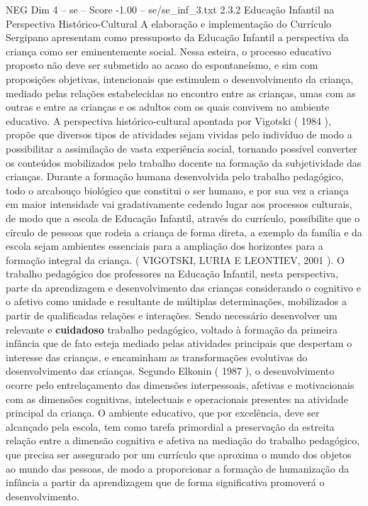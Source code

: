 \begin{textsample}{NEG Dim 4 – se – Score -1.00 – se/se\_inf\_3.txt}  \label{ex:f4_neg_145}
2.3.2 Educação Infantil na Perspectiva Histórico-Cultural A elaboração e implementação do Currículo Sergipano apresentam como pressuposto da Educação Infantil a perspectiva da criança como ser eminentemente social.
Nessa esteira, o processo educativo proposto não deve ser submetido ao acaso do espontaneísmo, e sim com proposições objetivas, intencionais que estimulem o desenvolvimento da criança, mediado pelas relações estabelecidas no encontro entre as crianças, umas com as outras e entre as crianças e os adultos com os quais convivem no ambiente educativo.
A perspectiva histórico-cultural apontada por Vigotski ( 1984 ), propõe que diversos tipos de atividades sejam vividas pelo indivíduo de modo a possibilitar a assimilação de vasta experiência social, tornando possível converter os conteúdos mobilizados pelo trabalho docente na formação da subjetividade das crianças.
Durante a formação humana desenvolvida pelo trabalho pedagógico, todo o arcabouço biológico que constitui o ser humano, e por sua vez a criança em maior intensidade vai gradativamente cedendo lugar aos processos culturais, de modo que a escola de Educação Infantil, através do currículo, possibilite que o círculo de pessoas que rodeia a criança de forma direta, a exemplo da família e da escola sejam ambientes essenciais para a ampliação dos horizontes para a formação integral da criança. ( VIGOTSKI, LURIA E LEONTIEV, 2001 ).
O trabalho pedagógico dos professores na Educação Infantil, nesta perspectiva, parte da aprendizagem e desenvolvimento das crianças considerando o cognitivo e o afetivo como unidade e resultante de múltiplas determinações, mobilizados a partir de qualificadas relações e interações.
Sendo necessário desenvolver um relevante e \textbf{cuidadoso} trabalho pedagógico, voltado à formação da primeira infância que de fato esteja mediado pelas atividades principais que despertam o interesse das crianças, e encaminham as transformações evolutivas do desenvolvimento das crianças.
Segundo Elkonin ( 1987 ), o desenvolvimento ocorre pelo entrelaçamento das dimensões interpessoais, afetivas e motivacionais com as dimensões cognitivas, intelectuais e operacionais presentes na atividade principal da criança.
O ambiente educativo, que por excelência, deve ser alcançado pela escola, tem como tarefa primordial a preservação da estreita relação entre a dimensão cognitiva e afetiva na mediação do trabalho pedagógico, que precisa ser assegurado por um currículo que aproxima o mundo dos objetos ao mundo das pessoas, de modo a proporcionar a formação de humanização da infância a partir da aprendizagem que de forma significativa promoverá o desenvolvimento.

\end{textsample}
